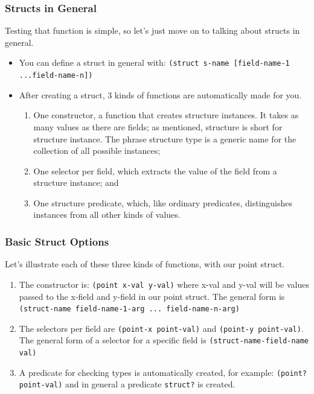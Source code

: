 \documentclass{beamer}
\begin{document}
\begin{frame}
  \frametitle{Structs in General}
  Testing that function is simple, so let's just move on to talking about
  structs in general.
  \begin{itemize}
  \item<2-> You can define a struct in general with:
    \texttt{(struct s-name [field-name-1 ...field-name-n])}
  \item<3-> After creating a struct, 3 kinds of functions are automatically
    made for you.
    \begin{enumerate}
    \item<4-> One constructor, a function that creates structure instances. It takes as many values as there are fields; as mentioned, structure is short for structure instance. The phrase structure type is a generic name for the collection of all possible instances;
    \item<5-> One selector per field, which extracts the value of the field from a structure instance; and
    \item<6-> One structure predicate, which, like ordinary predicates, distinguishes instances from all other kinds of values.
    \end{enumerate}
  \end{itemize}
\end{frame}

\begin{frame}
  \frametitle{Basic Struct Options}
  Let's illustrate each of these three kinds of functions, with our point
  struct.
  \begin{enumerate}
  \item<2-> The constructor is: \texttt{(point x-val y-val)}
    where x-val and y-val will be values passed to the x-field and y-field in
    our point struct. The general form is \texttt{(struct-name field-name-1-arg ... field-name-n-arg)}
  \item<3-> The selectors per field are \texttt{(point-x point-val)} and \texttt{(point-y point-val)}. The general form
    of a selector for a specific field is \texttt{(struct-name-field-name val)}
  \item<4-> A predicate for checking types is automatically created, for example:
    \texttt{(point? point-val)} and in general a predicate
    \texttt{struct?} is created.
  \end{enumerate}
\end{frame}
\end{document}
